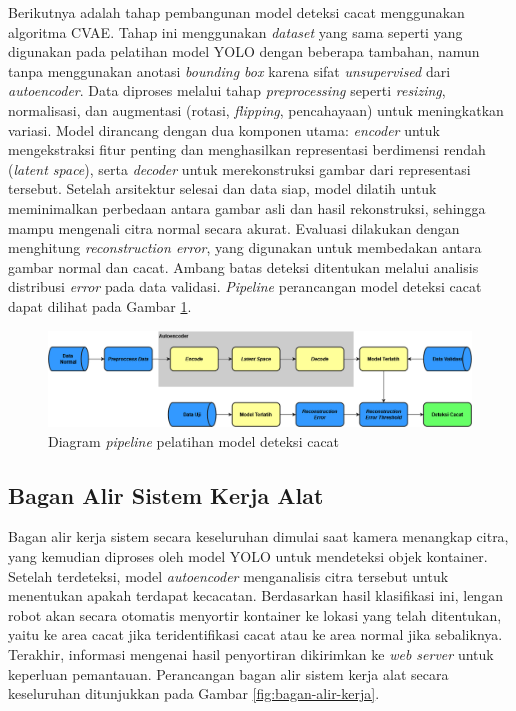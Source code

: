 Berikutnya adalah tahap pembangunan model deteksi cacat menggunakan
algoritma CVAE. Tahap ini menggunakan
\textit{dataset}
yang sama seperti yang digunakan pada pelatihan model YOLO dengan
beberapa tambahan, namun
tanpa menggunakan anotasi \textit{bounding box} karena sifat
\textit{unsupervised} dari
\textit{autoencoder}. Data diproses melalui tahap \textit{preprocessing} seperti
\textit{resizing}, normalisasi, dan augmentasi (rotasi,
\textit{flipping}, pencahayaan)
untuk meningkatkan variasi. Model dirancang dengan dua komponen
utama: \textit{encoder} untuk mengekstraksi fitur penting dan menghasilkan
representasi berdimensi rendah (\textit{latent space}), serta
\textit{decoder} untuk
merekonstruksi gambar dari representasi tersebut. Setelah arsitektur
selesai dan data siap, model dilatih untuk meminimalkan perbedaan
antara gambar asli dan hasil rekonstruksi, sehingga mampu mengenali
citra normal secara akurat. Evaluasi dilakukan dengan menghitung
\textit{reconstruction error}, yang digunakan untuk membedakan antara gambar
normal dan cacat. Ambang batas deteksi ditentukan melalui analisis
distribusi \textit{error} pada data validasi. \textit{Pipeline}
perancangan model
deteksi cacat dapat dilihat pada Gambar \ref{fig:pipeline-autoencoder}.

\begin{figure}[H]
  \centering
  \includegraphics[width=\textwidth]{gambar/pipeline_autoencoder.png}
  \caption{Diagram \textit{pipeline} pelatihan model deteksi cacat}
  \label{fig:pipeline-autoencoder}
\end{figure}
\vspace{-1em}

\vspace{1em}

\subsection{Bagan Alir Sistem Kerja Alat}
Bagan alir kerja sistem secara keseluruhan dimulai saat kamera
menangkap citra, yang
kemudian diproses oleh model YOLO untuk mendeteksi objek kontainer.
Setelah terdeteksi, model \textit{autoencoder} menganalisis citra tersebut
untuk menentukan apakah terdapat kecacatan. Berdasarkan hasil
klasifikasi ini, lengan robot akan secara otomatis menyortir
kontainer ke lokasi yang telah ditentukan, yaitu ke area cacat jika
teridentifikasi cacat atau ke area normal jika sebaliknya.
Terakhir, informasi mengenai hasil penyortiran dikirimkan ke \textit{web
server} untuk keperluan pemantauan. Perancangan bagan alir sistem kerja
alat secara keseluruhan ditunjukkan pada Gambar \ref{fig:bagan-alir-kerja}.

